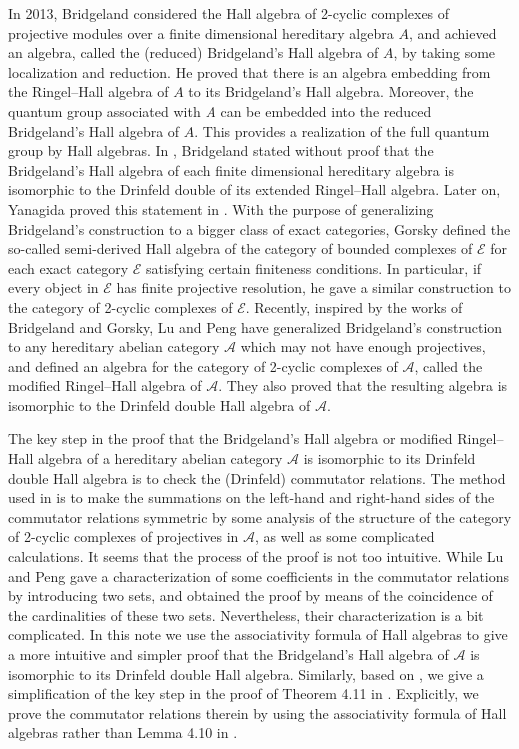 \documentclass[reqno,12pt]{amsart}
\numberwithin{equation}{section}
\def\A{{\mathcal A}}\def\P{{\mathscr{P}}}
\theoremstyle{plain} %
\theoremstyle{definition} %
\begin{document}
In 2013, Bridgeland \cite{Br} considered the Hall algebra of 2-cyclic complexes of projective modules over a finite dimensional hereditary algebra $A$, and achieved an algebra, called the (reduced) Bridgeland's Hall algebra of $A$, by taking some localization and reduction. He proved that there is an algebra embedding from the Ringel--Hall algebra of $A$ to its Bridgeland's Hall algebra. Moreover, the quantum group associated with \emph{A} can be embedded into the reduced Bridgeland's Hall algebra of $A$. This provides a realization of the full quantum group by Hall algebras. In \cite{Br}, Bridgeland stated without proof that the Bridgeland's Hall algebra of each finite dimensional hereditary algebra is isomorphic to the Drinfeld double of its extended Ringel--Hall algebra. Later on, Yanagida proved this statement in \cite{Yan}. With the purpose of generalizing Bridgeland's construction to a bigger class of exact categories, Gorsky \cite{Gor2} defined the so-called semi-derived Hall algebra of the category of bounded complexes of $\mathcal {E}$ for each exact category $\mathcal {E}$ satisfying certain finiteness conditions. In particular, if every object in $\mathcal {E}$ has finite projective resolution, he gave a similar construction to the category of 2-cyclic complexes of $\mathcal {E}$.
Recently, inspired by the works of Bridgeland and Gorsky, Lu and Peng \cite{LP} have generalized Bridgeland's construction to any hereditary abelian category $\A$ which may not have enough projectives, and defined an algebra for the category of 2-cyclic complexes of $\A$, called the modified Ringel--Hall algebra of $\A$. They also proved that the resulting algebra is isomorphic to the Drinfeld double Hall algebra of $\A$.

The key step in
the proof that the Bridgeland's Hall algebra or modified Ringel--Hall algebra of a hereditary abelian category $\A$ is isomorphic to its Drinfeld double Hall algebra is to check the (Drinfeld) commutator relations.
The method used in \cite{Yan} is to make the summations on the left-hand and right-hand sides of the commutator relations symmetric by some analysis of the structure of the category of 2-cyclic complexes of projectives in $\A$, as well as some complicated calculations. It seems that the process of the proof is not too intuitive. While Lu and Peng gave a characterization of some coefficients in the commutator relations by introducing two sets, and obtained the proof by means of the coincidence of the cardinalities of these two sets. Nevertheless, their characterization is a bit complicated. In this note we use the associativity formula of Hall algebras to give a more intuitive and simpler proof that the Bridgeland's Hall algebra of $\A$ is isomorphic to its Drinfeld double Hall algebra. Similarly, based on \cite{LP}, we give a simplification of the key step in the proof of Theorem 4.11 in \cite{LP}.
Explicitly, we prove the commutator relations therein by using the associativity formula of Hall algebras rather than Lemma 4.10 in \cite{LP}.
\end{document}
